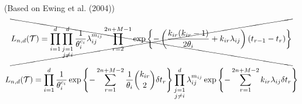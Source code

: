 (Based on Ewing et al. (2004))
\begin{equation}
	\xcancel{
		L_{n,d}(\mathcal{T}) = \prod_{i=1}^d \prod_{\substack{j=1 \\ j \neq i}}^d \frac{1}{\theta_i^{c_i}} \lambda_{ij}^{m_{ij}} \prod_{r=2}^{2n + M -1} \exp \left\{ - \left( \frac{k_{i r} (k_{i r} - 1)}{2 \theta_i} + k_{i r} \lambda_{i j} \right)(t_{r-1} - t_r) \right\}
	}
\end{equation}

\begin{equation} \label{eq:SCLike}
	L_{n,d}(\mathcal{T}) = \prod_{i=1}^d \frac{1}{\theta_i^{c_i}} \exp \left\{ -\sum_{r=1}^{2n+M-2} \frac{1}{\theta_i} \binom{k_{ir}}{2} \delta t_r \right\} \prod_{\substack{j=1 \\ j \neq i}}^d \lambda_{ij}^{m_{ij}} \exp \left\{ - \sum_{r=1}^{2n + M - 2} k_{ir} \lambda_{ij} \delta t_r \right\}
\end{equation}